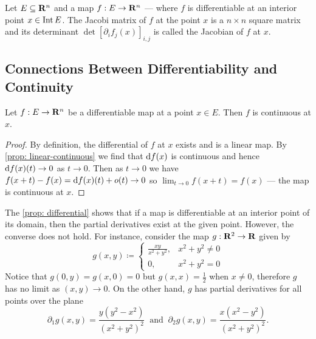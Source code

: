 \begin{definition}[Jacobian]\label{def: jacobian}
    Let \(E \subseteq \mathbf{R}^n\) and a map \(f: E \to \mathbf{R}^n\) --- where \(f\) is
    differentiable at an interior point \(x \in \operatorname{Int} E\). The Jacobi matrix of
    \(f\) at the point \(x\) is a \(n \times n\) square matrix and its determinant
    \(\det [\partial_i f_j(x)]_{i, j}\) is called the Jacobian of \(f\) at \(x\).
\end{definition}

\subsection{Connections Between Differentiability and Continuity}

\begin{corollary}
    Let \(f: E \to \mathbf{R}^n\) be a differentiable map at a point \(x \in E\).
    Then \(f\) is continuous at \(x\).
\end{corollary}

\begin{proof}
    By definition, the differential of \(f\) at \(x\) exists and is a linear map.
    By \cref{prop: linear-continuous} we find that \(\mathrm{d} f(x)\) is continuous and
    hence \(\mathrm{d} f(x)(t) \to 0\) as \(t \to 0\). Then as \(t \to 0\) we have
    \(f(x + t) - f(x) = \mathrm{d} f(x)(t) + o(t) \to 0\) so \(\lim_{t \to 0} f(x + t)
    = f(x)\) --- the map is continuous at \(x\).
\end{proof}

\begin{remark}
    The \cref{prop: differential} shows that if a map is differentiable at an
    interior point of its domain, then the partial derivatives exist at the given
    point. However, the converse does not hold. For instance, consider the map
    \(g: \mathbf{R}^2 \to \mathbf{R}\) given by
    \[
        g(x, y) \coloneq
        \begin{cases}
            \frac{x y}{x^2 + y^2}, & x^2 + y^2 \neq 0 \\
            0,                     & x^2 + y^2 = 0
        \end{cases}
    \]
    Notice that \(g(0, y) = g(x, 0) = 0\) but \(g(x, x) = \frac 1 2\) when \(x
    \neq 0\), therefore \(g\) has no limit as \((x,y) \to 0\). On the other hand,
    \(g\) has partial derivatives for all points over the plane
    \[
        \partial_1 g(x, y) = \frac{y (y^2 - x^2)}{(x^2 + y^2)^2}
        \ \text{ and }\
        \partial_2 g(x, y) = \frac{x (x^2 - y^2)}{(x^2 + y^2)^2}.
    \]
\end{remark}

